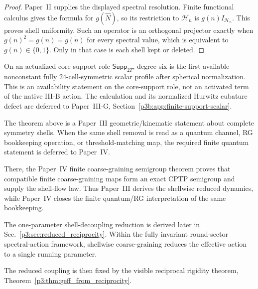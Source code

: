 \documentclass[12pt,a4paper]{article}
\begin{document}
\begin{proof}
Paper~II supplies the displayed spectral resolution.  Finite functional
calculus gives the formula for \(g(\widehat N)\), so its restriction to
\(\mathcal H_n\) is \(g(n)I_{\mathcal H_n}\).  This proves shell uniformity.
Such an operator is an orthogonal projector exactly when
\(g(n)^2=g(n)=\overline{g(n)}\) for every spectral value, which is equivalent
to \(g(n)\in\{0,1\}\).  Only in that case is each shell kept or deleted.
\end{proof}

\begin{remark}
\label{p3:rem:cubature-f4-use}
On an actualized core-support role \(\mathsf{Supp}_{2T}\),
degree six is the first available nonconstant fully \(24\)-cell-symmetric
scalar profile after spherical normalization.  This is an availability
statement on the core-support role, not an activated term of the native
III-B action.  The calculation and its normalized Hurwitz cubature defect are
deferred to Paper~III-G, Section~\ref{p3b:app:finite-support-scalar}.
\end{remark}


\begin{remark}
\label{p3:rem:p4-coarse-graining-closure}
\leavevmode\par\noindent
The theorem above is a Paper~III geometric/kinematic statement about complete
symmetry shells.  When the same shell removal is read as a quantum channel, RG
bookkeeping operation, or threshold-matching map, the required finite quantum
statement is deferred to Paper~IV.

There, the Paper~IV finite coarse-graining semigroup theorem proves that
compatible finite coarse-graining maps form an exact CPTP semigroup and supply
the shell-flow law.  Thus Paper~III derives the shellwise reduced dynamics,
while Paper~IV closes the finite quantum/RG interpretation of the same
bookkeeping.
\end{remark}


\begin{remark}
\label{p3:rem:D4-status}
\leavevmode\par\noindent
The one-parameter shell-decoupling reduction is derived later in
Sec.~\ref{p3:sec:reduced_reciprocity}.  Within the fully invariant
round-sector spectral-action framework, shellwise coarse-graining reduces the
effective action to a single running parameter.

The reduced coupling is then fixed by the visible reciprocal rigidity theorem,
Theorem~\ref{p3:thm:geff_from_reciprocity}.
\end{remark}
\end{document}
